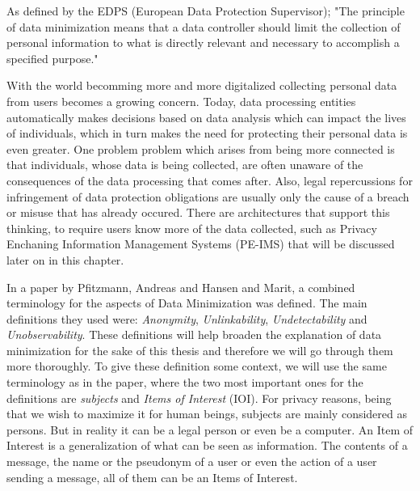 As defined by the EDPS (European Data Protection Supervisor); "The principle of data minimization means that a data controller should limit the collection of personal information to what is directly relevant and necessary to accomplish a specified purpose." \cite{website:europa.eu} %



With the world becomming more and more digitalized collecting personal data from users becomes a growing concern. Today, data processing entities automatically makes decisions based on data analysis which can impact the lives of individuals, which in turn makes the need for protecting their personal data is even greater.\cite{danezis2015privacy} One problem problem which arises from being more connected is that individuals, whose data is being collected, are often unaware of the consequences of the data processing that comes after. Also, legal repercussions for infringement of data protection obligations are usually only the cause of a breach or misuse that has already occured. There are architectures that support this thinking, to require users know more of the data collected, such as Privacy Enchaning Information Management Systems (PE-IMS) that will be discussed later on in this chapter. 




In a paper by Pfitzmann, Andreas and Hansen and Marit, a combined terminology for the aspects of Data Minimization was defined. The main definitions they used were: \textit{Anonymity}, \textit{Unlinkability}, \textit{Undetectability} and \textit{Unobservability}.\cite{pfitzmann2010terminology} These definitions will help broaden the explanation of data minimization for the sake of this thesis and therefore we will go through them more thoroughly. To give these definition some context, we will use the same terminology as in the paper, where the two most important ones for the definitions are \textit{subjects} and \textit{Items of Interest} (IOI). For privacy reasons, being that we wish to maximize it for human beings, subjects are mainly considered as persons. But in reality it can be a legal person or even be a computer. An Item of Interest is a generalization of what can be seen as information. The contents of a message, the name or the pseudonym of a user or even the action of a user sending a message, all of them can be an Items of Interest.


